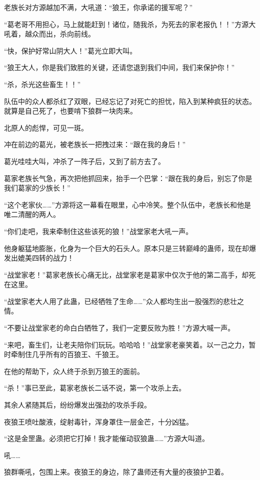 
\begin{this_body}

老族长对方源越加不满，大吼道：“狼王，你承诺的援军呢？”

“葛老哥不用担心，马上就能赶到！诸位，随我杀，为死去的家老报仇！！”方源大吼着，越众而出，杀向前线。

“快，保护好常山阴大人！”葛光立即大叫。

“狼王大人，你是我们致胜的关键，还请您退到我们中间，我们来保护你！”

“杀，杀光这些畜生！！”

队伍中的众人都杀红了双眼，已经忘记了对死亡的担忧，陷入到某种疯狂的状态。就算是自己死了，也要啃下狼群一块肉来。

北原人的彪悍，可见一斑。

冲在前边的葛光，被老族长一把拽过来：“跟在我的身后！”

葛光哇哇大叫，冲杀了一阵子后，又到了前方去了。

葛家老族长气急，再次把他抓回来，抬手一个巴掌：“跟在我的身后，别忘了你是我们葛家的少族长！”

“这个老家伙……”方源将这一幕看在眼里，心中冷笑。整个队伍中，老族长和他是唯二清醒的两人。

“你们走吧，我来牵制住这些该死的狼！”战堂家老大吼一声。

他身躯猛地膨胀，化身为一个巨大的石头人。原本只是三转巅峰的蛊师，现在却爆发出媲美四转的战力！

“战堂家老！”葛家老族长心痛无比，战堂家老是葛家中仅次于他的第二高手，却死在这里。

“战堂家老大人用了此蛊，已经牺牲了生命……”众人都均生出一股强烈的悲壮之情。

“不要让战堂家老的命白白牺牲了，我们一定要反败为胜！”方源大喊一声。

“来吧，畜生们，让老夫陪你们玩玩。哈哈哈！”战堂家老豪笑着。以一己之力，暂时牵制住几乎所有的百狼王、千狼王。

在他的帮助下，众人终于杀到万狼王的面前。

“杀！”事已至此，葛家老族长二话不说，第一个攻杀上去。

其余人紧随其后，纷纷爆发出强劲的攻杀手段。

夜狼王喷吐酸液，绽射毒针，浑身罩住一层金芒，十分凶猛。

“这是金罡蛊。必须把它打掉！我才能催动驭狼蛊……”方源大叫道。

吼……

狼群嘶吼，包围上来。夜狼王的身边，除了蛊师还有大量的夜狼护卫着。


\end{this_body}
